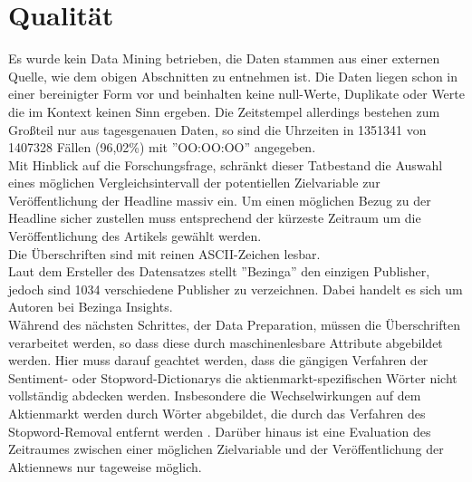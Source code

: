 \section*{Qualität}
Es wurde kein Data Mining betrieben, die Daten stammen aus einer externen Quelle, wie dem obigen Abschnitten zu entnehmen ist.
Die Daten liegen schon in einer bereinigter Form vor und beinhalten keine null-Werte, Duplikate oder Werte die im Kontext keinen Sinn ergeben. Die Zeitstempel allerdings bestehen zum Großteil nur aus tagesgenauen Daten, so sind die Uhrzeiten in 1351341 von 1407328 Fällen (96,02\%) mit ''OO:OO:OO'' angegeben.\\
Mit Hinblick auf die Forschungsfrage, schränkt dieser Tatbestand die Auswahl eines möglichen Vergleichsintervall der potentiellen Zielvariable zur Veröffentlichung der Headline massiv ein. Um einen möglichen Bezug zu der Headline sicher zustellen muss entsprechend der kürzeste Zeitraum um die Veröffentlichung des Artikels gewählt werden.\\
Die Überschriften sind mit reinen ASCII-Zeichen lesbar. \\ 
Laut dem Ersteller des Datensatzes stellt ''Bezinga'' den einzigen Publisher, jedoch sind 1034 verschiedene Publisher zu verzeichnen. Dabei handelt es sich um Autoren bei Bezinga Insights.\\
Während des nächsten Schrittes, der Data Preparation, müssen die Überschriften verarbeitet werden, so dass diese durch maschinenlesbare Attribute abgebildet werden. Hier muss darauf geachtet werden, dass die gängigen Verfahren der Sentiment- oder Stopword-Dictionarys die aktienmarkt-spezifischen Wörter nicht vollständig abdecken werden. Insbesondere die Wechselwirkungen auf dem Aktienmarkt werden durch Wörter abgebildet, die durch das Verfahren des Stopword-Removal entfernt werden \citep{sentimentTagTowards}. Darüber hinaus ist eine Evaluation des Zeitraumes zwischen einer möglichen Zielvariable und der Veröffentlichung der Aktiennews nur tageweise möglich.